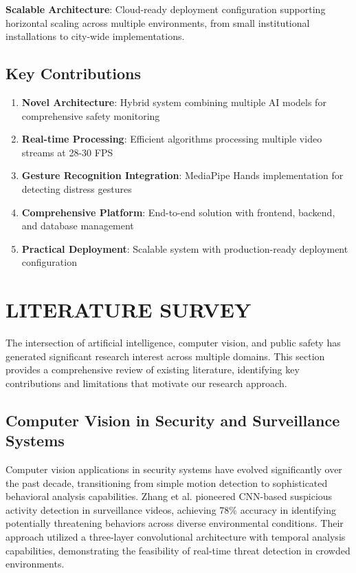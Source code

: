 \documentclass[12pt,a4paper]{article}
\begin{document}
\textbf{Scalable Architecture}: Cloud-ready deployment configuration supporting horizontal scaling across multiple environments, from small institutional installations to city-wide implementations.

\subsection{Key Contributions}
\begin{enumerate}
    \item \textbf{Novel Architecture}: Hybrid system combining multiple AI models for comprehensive safety monitoring
    \item \textbf{Real-time Processing}: Efficient algorithms processing multiple video streams at 28-30 FPS
    \item \textbf{Gesture Recognition Integration}: MediaPipe Hands implementation for detecting distress gestures
    \item \textbf{Comprehensive Platform}: End-to-end solution with frontend, backend, and database management
    \item \textbf{Practical Deployment}: Scalable system with production-ready deployment configuration
\end{enumerate}

\newpage
\section{LITERATURE SURVEY}

The intersection of artificial intelligence, computer vision, and public safety has generated significant research interest across multiple domains. This section provides a comprehensive review of existing literature, identifying key contributions and limitations that motivate our research approach.

\subsection{Computer Vision in Security and Surveillance Systems}

Computer vision applications in security systems have evolved significantly over the past decade, transitioning from simple motion detection to sophisticated behavioral analysis capabilities. Zhang et al. \cite{Zhang2019} pioneered CNN-based suspicious activity detection in surveillance videos, achieving 78\% accuracy in identifying potentially threatening behaviors across diverse environmental conditions. Their approach utilized a three-layer convolutional architecture with temporal analysis capabilities, demonstrating the feasibility of real-time threat detection in crowded environments.
\end{document}
